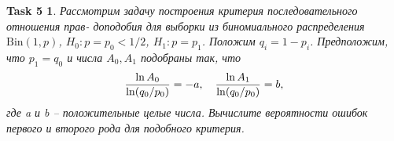 \documentclass[12pt,a4paper]{extarticle}
\newtheorem*{task5}{Task 5}
\newcommand{\Bin}{\mathrm{Bin}}
\begin{document}
	
	
	
	
	
	
	
	
	
	
	\vspace{\baselineskip}
	
	
	\begin{task5}
		Рассмотрим задачу построения критерия последовательного отношения прав-
		доподобия для выборки из биномиального распределения $\Bin(1, p)$, $H_0 : p = p_0 < 1/2$, $H_1 : p = p_1$. Положим $q_i = 1 - p_i$. Предположим, что $p_1 = q_0$ и числа $A_0 , A_1$ подобраны так, что
		\[
			{\ln A_0 \over \ln(q_0 / p_0)} = -a, \quad	{\ln A_1 \over \ln(q_0 / p_0)} = b,
		\]
		где a и b -- положительные целые числа. Вычислите вероятности ошибок
		первого и второго рода для подобного критерия.
	\end{task5}
\end{document}
